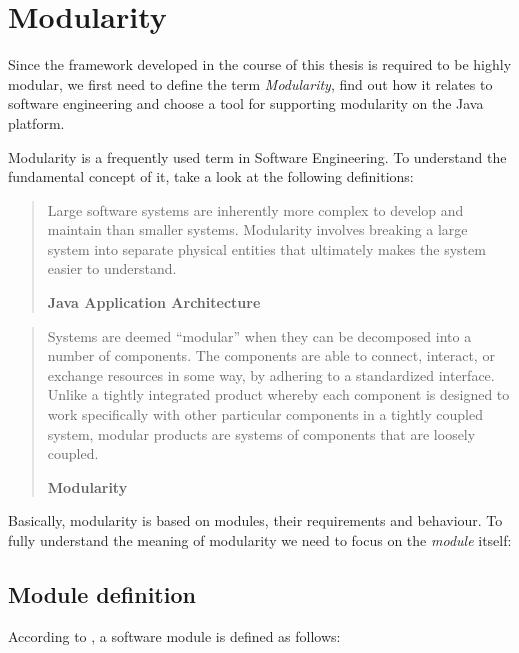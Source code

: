\section{Modularity}
\label{sec:modularity}

Since the framework developed in the course of this thesis is required to be highly modular, we first need to define the term \textit{Modularity}, find out how it relates to software engineering and choose a tool for supporting modularity on the Java platform.

Modularity is a frequently used term in Software Engineering. To understand the fundamental concept of it, take a look at the following definitions:

\begin{quote}
Large software systems are inherently more complex to develop and maintain than smaller systems. Modularity involves breaking a large system into separate physical entities that ultimately makes the system easier to understand.

\hfill \textbf{Java Application Architecture}

\hfill \citeauthor{Knoernschild:2012} \cite{Knoernschild:2012}
\end{quote}

\begin{quote}
Systems are deemed “modular” when they can be decomposed into a number of components. The components are able to connect, interact, or exchange resources in some way, by adhering to a standardized interface. Unlike a tightly integrated product whereby each component is designed to work specifically with other particular components in a tightly coupled system, modular products are systems of components that are loosely coupled.

\hfill \textbf{Modularity}

\hfill \citeauthor{Wikipedia:Modularity:2012} \cite{Wikipedia:Modularity:2012}
\end{quote}

Basically, modularity is based on modules, their requirements and behaviour. To fully understand the meaning of modularity we need to focus on the \textit{module} itself:

\subsection{Module definition}
\label{sec:module}

According to \citeauthor{Knoernschild:2012}, a software module is defined as follows:

